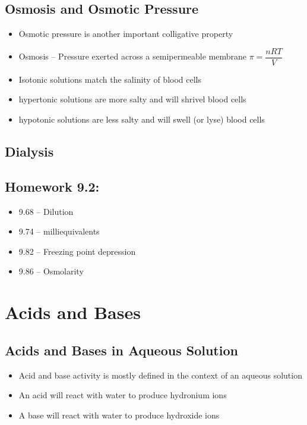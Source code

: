 \documentclass[12pt, openany, letterpaper]{memoir}
\begin{document}
\section{Osmosis and Osmotic Pressure}
\begin{itemize}
	\item Osmotic pressure is another important colligative property
	\item Osmosis -- Pressure exerted across a semipermeable membrane $\pi = \dfrac{nRT}{V}$
	\item Isotonic solutions match the salinity of blood cells
	\item hypertonic solutions are more salty and will shrivel blood cells
	\item hypotonic solutions are less salty and will swell (or lyse) blood cells
\end{itemize}

\section{Dialysis} %

\section*{Homework 9.2:}
\begin{itemize}
	\item 9.68 -- Dilution
	\item 9.74 -- milliequivalents
	\item 9.82 -- Freezing point depression
	\item 9.86 -- Osmolarity
\end{itemize}

\chapter{Acids and Bases} %
\section{Acids and Bases in Aqueous Solution}
\begin{itemize}
	\item Acid and base activity is mostly defined in the context of an aqueous solution
	\item An acid will react with water to produce hydronium ions
	\item A base will react with water to produce hydroxide ions
\end{itemize}
\end{document}
